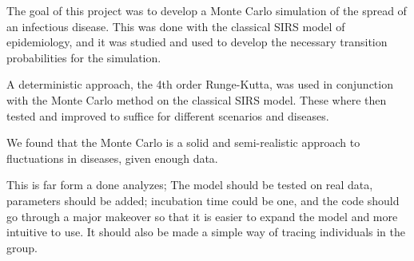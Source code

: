 

The goal of this project was to develop a Monte Carlo simulation of the spread of an infectious disease. This was done with the classical SIRS model of epidemiology, and it was studied and used to develop the necessary transition probabilities for the simulation. 

A deterministic approach, the  4th order Runge-Kutta,  was used in conjunction with the Monte Carlo method on the classical SIRS model. These where then tested and improved to suffice for different scenarios and diseases. 

We found that the Monte Carlo is a solid and semi-realistic approach to fluctuations in diseases, given enough data.

This is far form a done analyzes; The model should be tested on real data, parameters should be added; incubation time could be one,  and the code should go through a major makeover so that it is easier to expand the model and more intuitive to use. It should also be made a simple way of tracing individuals in the group.